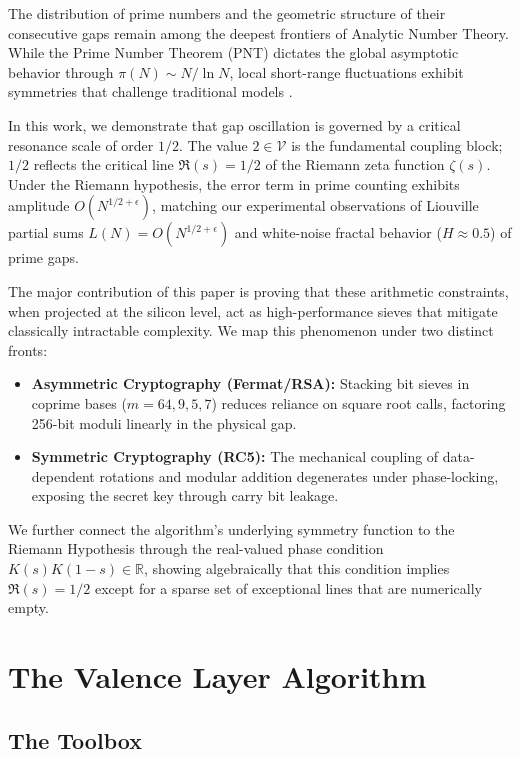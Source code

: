 \documentclass{sbc2023-pdf}%
\theoremstyle{plain}
\begin{document}
The distribution of prime numbers and the geometric structure of their consecutive gaps remain among the deepest frontiers of Analytic Number Theory. While the Prime Number Theorem (PNT) dictates the global asymptotic behavior through \(\pi(N) \sim N/\ln N\), local short-range fluctuations exhibit symmetries that challenge traditional models \citep{titchmarsh1986}.

In this work, we demonstrate that gap oscillation is governed by a critical resonance scale of order \(1/2\). The value \(2 \in \mathcal{V}\) is the fundamental coupling block; \(1/2\) reflects the critical line \(\Re(s) = 1/2\) of the Riemann zeta function \(\zeta(s)\). Under the Riemann hypothesis, the error term in prime counting exhibits amplitude \(O(N^{1/2+\epsilon})\), matching our experimental observations of Liouville partial sums \(L(N) = O(N^{1/2+\epsilon})\) and white-noise fractal behavior (\(H \approx 0.5\)) of prime gaps.

The major contribution of this paper is proving that these arithmetic constraints, when projected at the silicon level, act as high-performance sieves that mitigate classically intractable complexity. We map this phenomenon under two distinct fronts:

\begin{itemize}
  \item \textbf{Asymmetric Cryptography (Fermat/RSA):} Stacking bit sieves in coprime bases (\(m = 64, 9, 5, 7\)) reduces reliance on square root calls, factoring 256-bit moduli linearly in the physical gap.
  \item \textbf{Symmetric Cryptography (RC5):} The mechanical coupling of data-dependent rotations and modular addition degenerates under phase-locking, exposing the secret key through carry bit leakage.
\end{itemize}

We further connect the algorithm's underlying symmetry function to the Riemann Hypothesis through the real-valued phase condition \(K(s)K(1-s)\in\mathbb{R}\), showing algebraically that this condition implies \(\Re(s)=1/2\) except for a sparse set of exceptional lines that are numerically empty.

\section{The Valence Layer Algorithm}
\label{sec:alg}

\subsection{The Toolbox}
\label{sec:tools}
\end{document}
